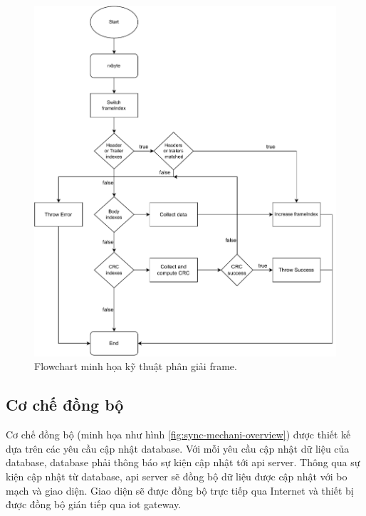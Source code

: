 \begin{figure}[htp]
\centering
\includegraphics[width=1.0\linewidth]{images/Thesis-Page-5-Frame-Parsing-Tech.pdf}
\caption{Flowchart minh họa kỹ thuật phân giải frame.}
\label{fig:frame-parsing-tech}
\end{figure}

\subsection{Cơ chế đồng bộ}

Cơ chế đồng bộ (minh họa như hình \ref{fig:sync-mechani-overview}) được thiết kế dựa trên các yêu cầu cập nhật database. Với mỗi yêu cầu cập nhật dữ liệu của database, database phải thông báo sự kiện cập nhật tới \acrshort{api} server. Thông qua sự kiện cập nhật từ database, \acrshort{api} server sẽ đồng bộ dữ liệu được cập nhật với bo mạch và giao diện. Giao diện sẽ được đồng bộ trực tiếp qua Internet và thiết bị được đồng bộ gián tiếp qua \acrshort{iot} gateway.

